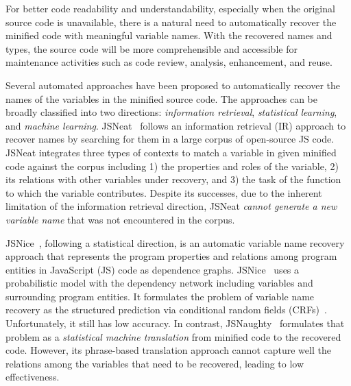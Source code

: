 For better code readability and understandability, especially when the
original source code is unavailable, there is a natural need to
automatically recover the minified code with meaningful variable
names. With the recovered names and types, the source code will be
more comprehensible and accessible for maintenance activities such
as code review, analysis, enhancement, and reuse.




Several automated approaches have been proposed to automatically
recover the names of the variables in the minified source code.  The
approaches can be broadly classified into two directions: {\em
  information retrieval}, {\em statistical learning}, and {\em machine
  learning}.  JSNeat~\cite{icse19} follows an information retrieval
(IR) approach to recover names by searching for them in a large corpus
of open-source JS code. JSNeat integrates three types of contexts to
match a variable in given minified code against the corpus including
1) the properties and roles of the variable, 2)
its relations with other variables under
recovery, and 3)
the task of the function to which the variable contributes.  Despite
its successes, due to the inherent limitation of the information
retrieval direction, JSNeat {\em cannot generate a new variable name}
that was not encountered in the corpus.

JSNice~\cite{JSNice2015}, following a statistical direction, is an
automatic variable name recovery approach that represents the program
properties and relations among program entities in JavaScript (JS)
code as dependence graphs. JSNice~\cite{JSNice2015} uses a
probabilistic model with the dependency network including
variables and surrounding program entities. It formulates the problem
of variable name recovery as the structured prediction via conditional
random fields (CRFs)~\cite{JSNice2015}. Unfortunately, it still has
low accuracy.
%
In contrast, JSNaughty~\cite{JSNaughty2017} formulates
that problem as a {\em statistical machine translation} from
minified code to the recovered code. However, its
phrase-based translation approach cannot capture well the relations
among the variables that need to be recovered, leading to low
effectiveness.

